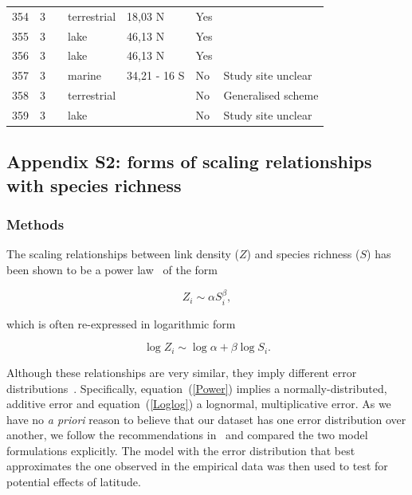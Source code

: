 \documentclass[12pt]{article}
\begin{document}
\begin{landscape}
\begin{table}[h!]
{\begin{tabular}{p{2.8cm}p{1.3cm}p{3cm}p{2.2cm}p{2.5cm}lp{8.2cm}}
        354   & 3 & \cite{Goldwasser1993}  & terrestrial & 18,03 N & Yes   &       \\
        355   & 3 & \cite{Cohen2003}    & lake  & 46,13 N & Yes   &       \\
        356   & 3 & \cite{Cohen2003}    & lake  & 46,13 N & Yes   &       \\
        357   & 3 & \cite{Yodzis1998} & marine & 34,21 - 16 S & No    & Study site unclear \\
        358   & 3 & \cite{Schroter2003}  & terrestrial &       & No    & Generalised scheme \\
        359   & 3 & \cite{Baiser2012}  & lake  &       & No    & Study site unclear \\
        \hline
      \end{tabular}%
        }
    \end{table}%

  \end{landscape}
\newpage

\subsection*{Appendix S2: forms of scaling relationships with species richness}

  \subsubsection*{Methods}

    The scaling relationships between link density ($Z$) and species richness ($S$)
    has been shown to be a power law~\cite{Riede2010} of the form 

    \begin{equation}
    \label{Power}
    Z_{i} \sim \alpha S_{i}^{\beta}  ,
    \end{equation}

    \noindent which is often re-expressed in logarithmic form 

    \begin{equation}
    \label{Loglog}
    \log{Z_{i}} \sim \log{\alpha} + \beta\log{S_{i}}  .
    \end{equation}

    \noindent Although these relationships are very similar, they imply different error distributions~\cite{Xiao2011}.
    Specifically, equation~(\ref{Power}) implies a normally-distributed, additive 
    error and equation~(\ref{Loglog}) a lognormal,
    multiplicative error. As we have no \emph{a priori} reason to believe that our dataset 
    has one error distribution over another, we follow the recommendations in~\cite{Xiao2011} and compared the two
    model formulations explicitly. The model with the error distribution that best approximates the one
    observed in the empirical
    data was then used to test for potential effects of latitude.
\end{document}
